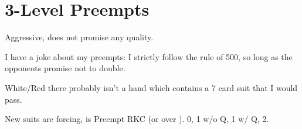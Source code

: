 \documentclass[tom-jenni]{subfile}
\begin{document}
	
	\chapter{3-Level Preempts}
	
	Aggressive, does not promise any quality. 
	
	I have a joke about my preempts: I strictly follow the rule of 500, so long as the opponents promise not to double.
	
	White/Red there probably isn't a hand which contains a 7 card suit that I would pass.
	
	New suits are forcing,  is Preempt RKC (or  over ). 0, 1 w/o Q, 1 w/ Q, 2.
	
\end{document}
